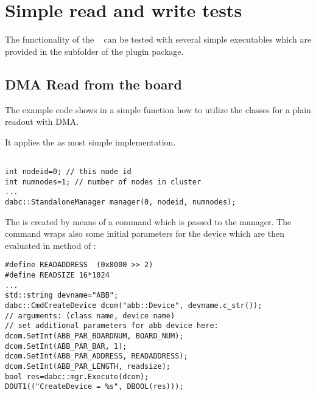 \section{Simple read and write tests}
\label{prog_exapci_simpletest}
The functionality of the \ABB~ can be tested with several simple
executables which are provided in the  subfolder of the
 plugin package.

\subsection{DMA Read from the board}
\label{prog_exapci_simpletest_read}
The example code  shows in a
simple  function how to utilize the
 classes 
for a plain readout with DMA.
\begin{compactenum} 

\item It applies the  as most simple
 implementation.
\begin{small}
\begin{verbatim}

int nodeid=0; // this node id
int numnodes=1; // number of nodes in cluster
...
dabc::StandaloneManager manager(0, nodeid, numnodes);
\end{verbatim}
\end{small}

\item The  is created by means of a command
 which is passed to the manager. The 
command wraps also some initial
parameters for the device which are then evaluated in 
method  of :

\begin{small}
\begin{verbatim}
#define READADDRESS  (0x8000 >> 2)
#define READSIZE 16*1024
...
std::string devname="ABB";
dabc::CmdCreateDevice dcom("abb::Device", devname.c_str());
// arguments: (class name, device name)
// set additional parameters for abb device here:
dcom.SetInt(ABB_PAR_BOARDNUM, BOARD_NUM);
dcom.SetInt(ABB_PAR_BAR, 1);
dcom.SetInt(ABB_PAR_ADDRESS, READADDRESS);
dcom.SetInt(ABB_PAR_LENGTH, readsize);
bool res=dabc::mgr.Execute(dcom);
DOUT1(("CreateDevice = %s", DBOOL(res)));
\end{verbatim}
\end{small}


\end{compactenum}

